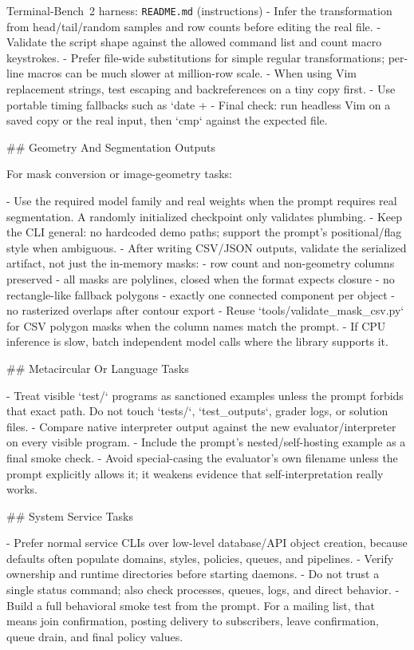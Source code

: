 \begin{promptbox}{Terminal-Bench~2 harness: \texttt{README.md} (instructions)}
- Infer the transformation from head/tail/random samples and row counts before editing the real file.
- Validate the script shape against the allowed command list and count macro keystrokes.
- Prefer file-wide substitutions for simple regular transformations; per-line macros can be much slower at million-row scale.
- When using Vim replacement strings, test escaping and backreferences on a tiny copy first.
- Use portable timing fallbacks such as `date +%
- Final check: run headless Vim on a saved copy or the real input, then `cmp` against the expected file.

## Geometry And Segmentation Outputs

For mask conversion or image-geometry tasks:

- Use the required model family and real weights when the prompt requires real segmentation. A randomly initialized checkpoint only validates plumbing.
- Keep the CLI general: no hardcoded demo paths; support the prompt's positional/flag style when ambiguous.
- After writing CSV/JSON outputs, validate the serialized artifact, not just the in-memory masks:
  - row count and non-geometry columns preserved
  - all masks are polylines, closed when the format expects closure
  - no rectangle-like fallback polygons
  - exactly one connected component per object
  - no rasterized overlaps after contour export
- Reuse `tools/validate_mask_csv.py` for CSV polygon masks when the column names match the prompt.
- If CPU inference is slow, batch independent model calls where the library supports it.

## Metacircular Or Language Tasks

- Treat visible `test/` programs as sanctioned examples unless the prompt forbids that exact path. Do not touch `tests/`, `test_outputs`, grader logs, or solution files.
- Compare native interpreter output against the new evaluator/interpreter on every visible program.
- Include the prompt's nested/self-hosting example as a final smoke check.
- Avoid special-casing the evaluator's own filename unless the prompt explicitly allows it; it weakens evidence that self-interpretation really works.

## System Service Tasks

- Prefer normal service CLIs over low-level database/API object creation, because defaults often populate domains, styles, policies, queues, and pipelines.
- Verify ownership and runtime directories before starting daemons.
- Do not trust a single status command; also check processes, queues, logs, and direct behavior.
- Build a full behavioral smoke test from the prompt. For a mailing list, that means join confirmation, posting delivery to subscribers, leave confirmation, queue drain, and final policy values.


\end{promptbox}
